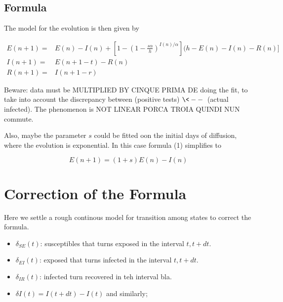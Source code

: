 \documentclass{article}
\theoremstyle{definition}
\theoremstyle{plain}
\theoremstyle{plain}
\begin{document}
\subsection{Formula}
The model for the evolution is then given by

\begin{align}
    E(n+1)  = & E(n)-I(n) + \left [ 1-\left (1-\frac{s\alpha}{h} \right )^{I(n) / \alpha}  \right ]( h- E(n) - I(n) - R(n) ] \\
    I(n+1) = & E(n+1-t)- R(n) \\
    R(n+1) = & I(n+1-r) 
\end{align}

Beware: data must be MULTIPLIED BY CINQUE PRIMA DE doing the fit, to take into account the discrepancy between (positive tests) $\<--\> $ (actual infected). The phenomenon is NOT LINEAR PORCA TROIA QUINDI NUN commute.

Also, maybe the parameter $s$ could be fitted oon the initial days of diffusion, where the evolution is exponential. In this case formula (1) simplifies to

$$     E(n+1)  = (1+s) E(n)-I(n)   $$

\section{Correction of the Formula}
Here we settle a rough continous model for transition among states to correct the formula.

\begin{itemize}
    \item $\delta_{SE}(t)$: susceptibles that turns exposed in the interval $t, t+dt$.
    \item $\delta_{EI}(t)$: exposed that turns infected in the interval $t, t+dt$.
    \item $\delta_{IR}(t) $: infected turn recovered in teh interval bla.
    \item $ \delta I (t) = I(t+dt) - I(t)$ and similarly;
\end{itemize}
\end{document}
